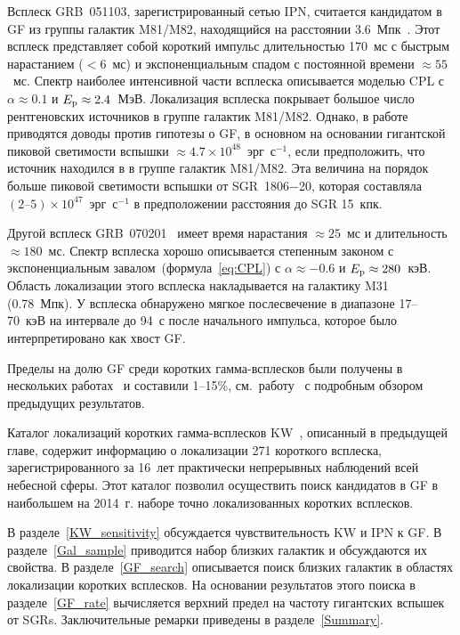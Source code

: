 Всплеск GRB~051103, зарегистрированный сетью IPN, считается 
кандидатом в GF из группы галактик M81/M82, находящийся на расстоянии 
3.6~Мпк~\citep{Ofek_2006ApJ, Frederiks_2007AstLett, Hurley2010}. 
Этот всплеск представляет собой короткий импульс длительностью 170~мс с быстрым 
нарастанием ($<6$~мс) и экспоненциальным спадом с постоянной времени $\approx 55$~мс. 
Спектр наиболее интенсивной части всплеска описывается моделью 
CPL с $\alpha \approx 0.1$ и $E_{\mathrm{p}} \approx 2.4$~МэВ. Локализация всплеска 
покрывает большое число рентгеновских источников в группе галактик M81/M82. Однако, 
в работе~\citep{Hurley2010} приводятся доводы против гипотезы о GF, в основном 
на основании гигантской пиковой светимости вспышки $\approx 4.7\times10^{48}$~эрг~с$^{-1}$,
если предположить, что источник находился в в группе галактик M81/M82.
Эта величина на порядок больше пиковой светимости вспышки от SGR~1806$-$20, которая 
составляла $(2\textrm{--}5)\times 10^{47}$~эрг~с$^{-1}$ в предположении 
расстояния до SGR 15~кпк.

Другой всплеск GRB~070201~\citep{Mazets_2008ApJ,Ofek_2008ApJ} имеет время нарастания $\approx 25$~мс 
и длительность $\approx 180$~мс. Спектр всплеска хорошо описывается степенным законом 
с экспоненциальным завалом~(формула~\ref{eq:CPL}) с $\alpha\approx-0.6$ и $E_{\mathrm{p}}\approx 280$~кэВ. 
Область локализации этого всплеска накладывается на галактику M31 (0.78~Мпк). У всплеска обнаружено 
мягкое послесвечение в диапазоне 17--70~кэВ на интервале до 94~с после начального 
импульса, которое было интерпретировано как хвост GF.

Пределы на долю GF среди коротких гамма-всплесков были получены в нескольких 
работах~\citep{Lazzati2005,Palmer2005,Nakar2006ApJ,Popov2006,Ofek_2007ApJ,Tikhomirova2010AstL} 
и составили 1--15\%, см.~работу~\citep{Hurley2011} с подробным обзором предыдущих результатов.

Каталог локализаций коротких гамма-всплесков KW~\citep{Palshin2013}, 
описанный в предыдущей главе, содержит информацию о локализации 271 короткого 
всплеска, зарегистрированного за 16~лет практически непрерывных наблюдений всей 
небесной сферы. Этот каталог позволил осуществить поиск кандидатов в GF 
в наибольшем на 2014~г. наборе точно локализованных коротких всплесков.

В разделе~\ref{KW_sensitivity} обсуждается чувствительность KW и IPN к GF.
В разделе~\ref{Gal_sample} приводится набор близких галактик и обсуждаются их свойства. 
В разделе~\ref{GF_search} описывается поиск близких галактик в областях локализации 
коротких всплесков. На основании результатов этого поиска в разделе~\ref{GF_rate} 
вычисляется верхний предел на частоту гигантских вспышек от SGRs. Заключительные 
ремарки приведены в разделе~\ref{Summary}.

